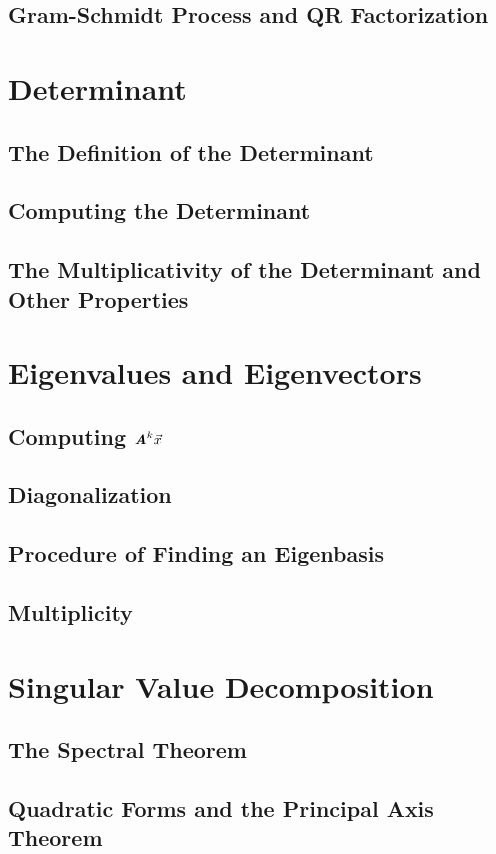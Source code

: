 \documentclass[12pt, a4paper]{article}
\def\vecx{\vec{x}}
\def\matrixA{\textbf{\emph{A}}}
\begin{document}
\subsection{Gram-Schmidt Process and QR Factorization}


\newpage
\section{Determinant}
\subsection{The Definition of the Determinant}

\subsection{Computing the Determinant}

\subsection{The Multiplicativity of the Determinant and Other Properties}

\newpage
\section{Eigenvalues and Eigenvectors}
\subsection{Computing $\matrixA^k\vecx$}

\subsection{Diagonalization}

\subsection{Procedure of Finding an Eigenbasis}

\subsection{Multiplicity}

\newpage
\section{Singular Value Decomposition}
\subsection{The Spectral Theorem}

\subsection{Quadratic Forms and the Principal Axis Theorem}
\end{document}

